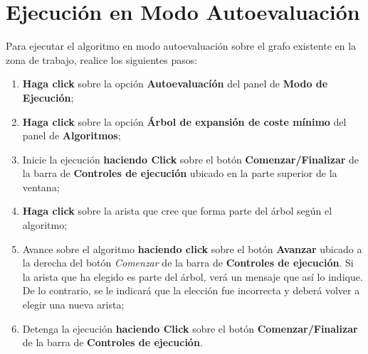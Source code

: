 \documentclass{book}
\begin{document}
\section{Ejecución en Modo Autoevaluación}

Para ejecutar el algoritmo en modo autoevaluación sobre el grafo existente en la zona de trabajo, realice los siguientes pasos:
\medskip

\begin{enumerate}
	\itemsep=8pt \topsep=0pt \partopsep=0pt \parskip=0pt \parsep=0pt

	\item \textbf{Haga click} sobre la opción \textbf{Autoevaluacíón} del panel de \textbf{Modo de Ejecución};

	\item \textbf{Haga click} sobre la opción \textbf{Árbol de expansión de coste mínimo} del panel de \textbf{Algoritmos};

	\item Inicie la ejecución \textbf{haciendo Click} sobre el botón \textbf{Comenzar/Finalizar} de la barra de \textbf{Controles de ejecución} ubicado en la parte superior de la ventana;

	\item \textbf{Haga click} sobre la arista que cree que forma parte del árbol según el algoritmo;

	\item Avance sobre el algoritmo \textbf{haciendo click} sobre el botón \textbf{Avanzar} ubicado a la derecha del botón \textit{Comenzar} de la barra de \textbf{Controles de ejecución}. Si la arista que ha elegido es parte del árbol, verá un mensaje que así lo indique. De lo contrario, se le indicará que la elección fue incorrecta y deberá volver a elegir una nueva arista;

	\item Detenga la ejecución \textbf{haciendo Click} sobre el botón \textbf{Comenzar/Finalizar} de la barra de \textbf{Controles de ejecución}.

\end{enumerate}
\medskip
\end{document}
